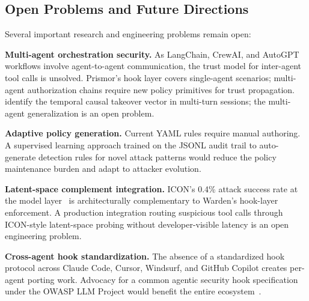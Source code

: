 \documentclass[11pt,letterpaper]{article}
\begin{document}
\subsection{Open Problems and Future Directions}

Several important research and engineering problems remain open:

\textbf{Multi-agent orchestration security.} As LangChain, CrewAI, and AutoGPT
workflows involve agent-to-agent communication, the trust model for inter-agent tool
calls is unsolved. Prismor's hook layer covers single-agent scenarios; multi-agent
authorization chains require new policy primitives for trust propagation.
\citet{authors2026agentsentry} identify the temporal causal takeover vector in multi-turn
sessions; the multi-agent generalization is an open problem.

\textbf{Adaptive policy generation.} Current YAML rules require manual authoring.
A supervised learning approach trained on the JSONL audit trail to auto-generate
detection rules for novel attack patterns would reduce the policy maintenance burden
and adapt to attacker evolution.

\textbf{Latent-space complement integration.} ICON's 0.4\% attack success rate at
the model layer~\citep{wang2026icon} is architecturally complementary to Warden's
hook-layer enforcement. A production integration routing suspicious tool calls through
ICON-style latent-space probing without developer-visible latency is an open
engineering problem.

\textbf{Cross-agent hook standardization.} The absence of a standardized hook protocol
across Claude Code, Cursor, Windsurf, and GitHub Copilot creates per-agent porting work.
Advocacy for a common agentic security hook specification under the OWASP LLM Project
would benefit the entire ecosystem~\citep{research2026architecting}.

\clearpage


\end{document}
